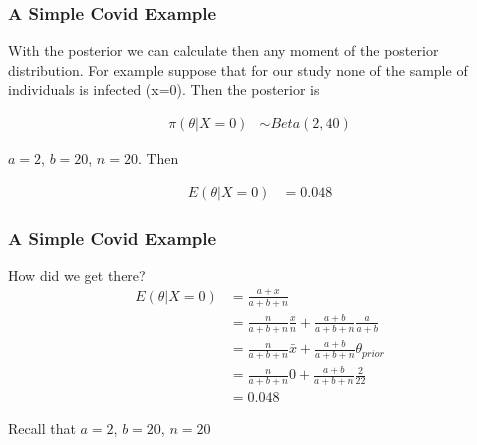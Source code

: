 \documentclass[
  shownotes,
  xcolor={svgnames},
  hyperref={colorlinks,citecolor=DarkBlue,linkcolor=DarkRed,urlcolor=DarkBlue}
  , aspectratio=169]{beamer}
\begin{document}
\begin{frame}[fragile]
\frametitle{A Simple Covid Example}
With the posterior we can calculate then any moment of the posterior distribution. For example suppose that for our study none of the sample of individuals is infected (x=0). Then the posterior is 

\medskip
\begin{align}
\pi(\theta|X=0) &\sim Beta(2,40)
\end{align}

\medskip
$a= 2$, $b=20$, $n=20$. Then

\medskip

\begin{align}
E(\theta|X=0)  &= 0.048 
\end{align}

\end{frame}
\begin{frame}[fragile]
\frametitle{A Simple Covid Example}

How did we get there?
\medskip
\begin{align}
E(\theta|X=0)  &= \frac{a+x}{a+b+n} \\
               &= \frac{n}{a+b+n} \frac{x}{n} + \frac{a+b}{a+b+n} \frac{a}{a+b}  \\
               &= \frac{n}{a+b+n} \bar x + \frac{a+b}{a+b+n} \theta_{prior}  \\
               &= \frac{n}{a+b+n} 0 + \frac{a+b}{a+b+n} \frac{2}{22}  \\
 &= 0.048 
\end{align}

Recall that $a= 2$, $b=20$, $n=20$

\end{frame}
\end{document}
